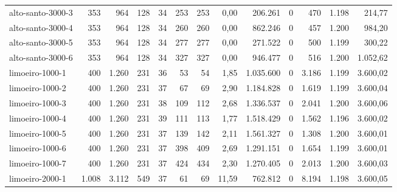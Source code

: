 \begin{table}[ht!]
{\begin{tabular}{lrrrrrrrrrrrr}
			\rowcolor{rowgrey}alto-santo-3000-3                                                      & 353   & 964   & 128 & 34 & 253 & 253 & 0,00  & 206.261   & 0 & 470    & 1.198 & 214,77   \\
			\rowcolor{rowgrey}alto-santo-3000-4                                                      & 353   & 964   & 128 & 34 & 260 & 260 & 0,00  & 862.246   & 0 & 457    & 1.200 & 984,20   \\
			\rowcolor{rowgrey}alto-santo-3000-5                                                      & 353   & 964   & 128 & 34 & 277 & 277 & 0,00  & 271.522   & 0 & 500    & 1.199 & 300,22   \\
			\rowcolor{rowgrey}alto-santo-3000-6                                                      & 353   & 964   & 128 & 34 & 327 & 327 & 0,00  & 946.477   & 0 & 516    & 1.200 & 1.052,62 \\ \midrule
			\rowcolor{rowlight}limoeiro-1000-1                                                       & 400   & 1.260 & 231 & 36 & 53  & 54  & 1,85  & 1.035.600 & 0 & 3.186  & 1.199 & 3.600,02 \\
			\rowcolor{rowlight}limoeiro-1000-2                                                       & 400   & 1.260 & 231 & 37 & 67  & 69  & 2,90  & 1.184.828 & 0 & 1.619  & 1.199 & 3.600,04 \\
			\rowcolor{rowlight}limoeiro-1000-3                                                       & 400   & 1.260 & 231 & 38 & 109 & 112 & 2,68  & 1.336.537 & 0 & 2.041  & 1.200 & 3.600,06 \\
			\rowcolor{rowlight}limoeiro-1000-4                                                       & 400   & 1.260 & 231 & 39 & 111 & 113 & 1,77  & 1.518.429 & 0 & 1.562  & 1.196 & 3.600,02 \\
			\rowcolor{rowlight}limoeiro-1000-5                                                       & 400   & 1.260 & 231 & 37 & 139 & 142 & 2,11  & 1.561.327 & 0 & 1.308  & 1.200 & 3.600,01 \\
			\rowcolor{rowlight}limoeiro-1000-6                                                       & 400   & 1.260 & 231 & 37 & 398 & 409 & 2,69  & 1.291.151 & 0 & 1.654  & 1.199 & 3.600,01 \\
			\rowcolor{rowlight}limoeiro-1000-7                                                       & 400   & 1.260 & 231 & 37 & 424 & 434 & 2,30  & 1.270.405 & 0 & 2.013  & 1.200 & 3.600,03 \\
			\rowcolor{rowlight}limoeiro-2000-1                                                       & 1.008 & 3.112 & 549 & 37 & 61  & 69  & 11,59 & 762.812   & 0 & 8.194  & 1.198 & 3.600,05 \\

\end{tabular}}
\end{table}
